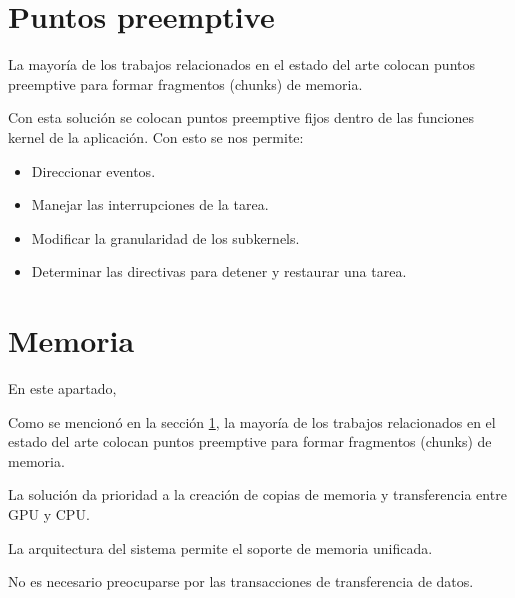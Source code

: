   
  \section{Puntos preemptive}\label{puntosPreemptive}




La mayoría de los trabajos relacionados en el estado del arte colocan puntos preemptive para formar fragmentos (chunks) de memoria.

Con esta solución se colocan puntos preemptive fijos dentro de las funciones kernel de la aplicación. Con esto se nos permite:

\begin{itemize}
\item Direccionar eventos.
\item Manejar las interrupciones de la tarea.
\item Modificar la granularidad de los subkernels.
\item Determinar las directivas para detener y restaurar una tarea.
\end{itemize}     





  
  \section{Memoria}
  
  En este apartado, 
  
  Como se mencionó en la sección \ref{puntosPreemptive}, la mayoría de los trabajos relacionados en el estado del arte colocan puntos preemptive para formar fragmentos (chunks) de memoria.
  
  La solución da prioridad a la creación de copias de memoria y transferencia entre GPU y CPU.
  
  La arquitectura del sistema permite el soporte de memoria unificada.
  
  No es necesario preocuparse por las transacciones de transferencia de datos.
  
